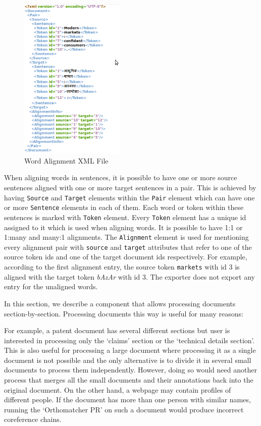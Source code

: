 \begin{figure}[ht]
\centering
\includegraphics[width=5cm]{wa-xml-output.png}
\caption{Word Alignment XML File} 
\label{fig:wa-xml-output}
\end{figure}

When aligning words in sentences, it is possible to have one or more source 
sentences aligned with one or more target sentences in a pair. This is achieved
by having {\tt Source} and {\tt Target} elements within the {\tt Pair} element
which can have one or more {\tt Sentence} elements in each of them. Each 
word or token within these sentences is marked with {\tt Token} element. 
Every {\tt Token} element has a unique id assigned to it which is used when 
aligning words.  It is possible to have 1:1 or 1:many and many:1 alignments.  
The {\tt Alignment} element is used for mentioning every alignment pair with 
{\tt source} and {\tt target} attributes that refer to one of the source token 
ids and one of the target document ids respectively.  For example, according to 
the first alignment entry, the source token  {\tt markets} with id 3 is aligned 
with the target token {\it bAzAr} with id 3. The exporter does not export any 
entry for the unaligned words.


In this section, we describe a component that allows processing documents 
section-by-section. Processing documents this way is useful for many reasons:

For example, a patent document has several different sections but user is  
interested in processing only the `claims' section or the `technical details 
section'.  This is also useful for processing a large document where processing 
it as a single document is not possible and the only alternative is to divide 
it in several small documents to process them independently.  However, doing so 
would need another process that merges all the small documents and their 
annotations back into the original document. On the other hand, a webpage may 
contain profiles of different people. If the document has more than one person
with similar names, running the `Orthomatcher PR' on such a document would 
produce incorrect coreference chains.


